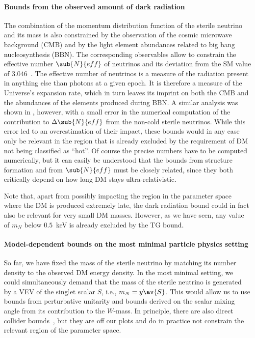 \paragraph{Bounds from the observed amount of dark radiation}
The combination of the momentum distribution function of the sterile neutrino and its mass is also constrained by the observation of the cosmic microwave background (CMB) and by the light element abundances related to big bang nucleosynthesis (BBN). The corresponding observables allow to constrain the effective number $\sub{N}{eff}$ of neutrinos and its deviation from the SM value of $3.046$~\cite{Mangano:2005cc}. The effective number of neutrinos is a measure of the radiation present in anything else than photons at a given epoch. It is therefore a measure of the Universe's expansion rate, which in turn leaves its imprint on both the CMB and the abundances of the elements produced during BBN. A similar analysis was shown in \cite[fig.~9]{Merle:2015oja}, however, with a small error in the numerical computation of the contribution to $\Delta\sub{N}{eff}$ from the non-cold sterile neutrinos. While this error led to an overestimation of their impact, these bounds would in any case only be relevant in the region that is already excluded by the requirement of DM not being classified as ``hot''. Of course the precise numbers have to be computed numerically, but it can easily be understood that the bounds from structure formation and from $\sub{N}{eff}$ must be closely related, since they both critically depend on how long DM stays ultra-relativistic.
  
Note that, apart from possibly impacting the region in the parameter space where the DM is produced extremely late, the dark radiation bound could in fact also be relevant for very small DM masses. However, as we have seen, any value of $m_N$ below $0.5$~keV is already excluded by the TG bound.


\paragraph{Model-dependent bounds on the most minimal particle physics setting}
So far, we have fixed the mass of the sterile neutrino by matching its number density to the observed DM energy density. In the most minimal setting, we could simultaneously demand that the mass of the sterile neutrino is generated by a VEV of the singlet scalar $S$, i.e., $m_N=y\av{S}$. This would allow us to use bounds from perturbative unitarity and bounds derived on the scalar mixing angle from its contribution to the $W$-mass. In principle, there are also direct collider bounds~\cite{Robens:2015gla}, but they are off our plots and do in practice not constrain the relevant region of the parameter space.

